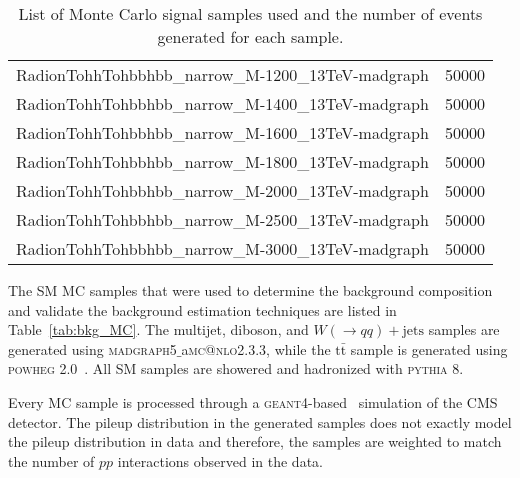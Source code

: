 \begin{table}[h!]
\begin{center}
\begin{tabular}{l|c}
      {RadionTohhTohbbhbb\_narrow\_M-1200\_13TeV-madgraph}  & 50000 \\
      {RadionTohhTohbbhbb\_narrow\_M-1400\_13TeV-madgraph}  & 50000 \\
      {RadionTohhTohbbhbb\_narrow\_M-1600\_13TeV-madgraph}  & 50000 \\
      {RadionTohhTohbbhbb\_narrow\_M-1800\_13TeV-madgraph}  & 50000 \\
      {RadionTohhTohbbhbb\_narrow\_M-2000\_13TeV-madgraph}  & 50000 \\
      {RadionTohhTohbbhbb\_narrow\_M-2500\_13TeV-madgraph}  & 50000 \\
      {RadionTohhTohbbhbb\_narrow\_M-3000\_13TeV-madgraph}  & 50000 \\
      \hline
      \hline
    \end{tabular}
  \end{center}
  \caption{List of Monte Carlo signal samples used and the number of events generated for each sample. \label{tab:signal_MC}}
\end{table}


The SM MC samples that were used to determine the background composition and validate the background estimation techniques are listed in Table~\ref{tab:bkg_MC}. The multijet, diboson, and $W(\rightarrow qq) + \mathrm{jets}$ samples are generated using \textsc{madgraph5}$\_$a\textsc{mc}\textsc{@nlo}2.3.3, while the $\mathrm{t\bar{t}}$ sample is generated using \textsc{powheg} 2.0~\cite{POWHEG, POWHEG2, POWHEG3}. All SM samples are showered and hadronized with \textsc{pythia} 8. 

Every MC sample is processed through a \textsc{geant4}-based~\cite{GEANT4, GEANT42} simulation of the CMS detector. The pileup distribution in the generated samples does not exactly model the pileup distribution in data and therefore, the samples are weighted to match the number of $pp$ interactions observed in the data.



